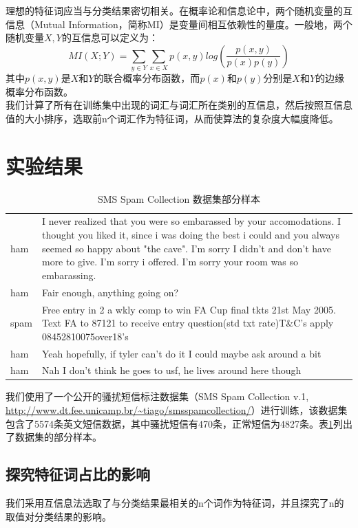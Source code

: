 \documentclass[a4paper, twocolumn, 12pt]{article}
\begin{document}
理想的特征词应当与分类结果密切相关。在概率论和信息论中，两个随机变量的互信息（Mutual Information，简称MI）是变量间相互依赖性的量度。一般地，两个随机变量$X, Y$的互信息可以定义为：
\[MI(X; Y)=\sum_{y\in Y}\sum_{x\in X}p(x, y)log(\frac{p(x, y)}{p(x)p(y)})\]
其中$p(x,y)$是$X$和$Y$的联合概率分布函数，而$p(x)$和$p(y)$分别是$X$和$Y$的边缘概率分布函数。\\

我们计算了所有在训练集中出现的词汇与词汇所在类别的互信息，然后按照互信息值的大小排序，选取前n个词汇作为特征词，从而使算法的复杂度大幅度降低。

\section{实验结果}

\begin{table}[hbtp]
    \centering
    \begin{tabular}{lp{14cm}}
        \hline
        ham&	I never realized that you were so embarassed by your accomodations. I thought you liked it, since i was doing the best i could and you always seemed so happy about "the cave". I'm sorry I didn't and don't have more to give. I'm sorry i offered. I'm sorry your room was so embarassing.\\
        ham&	Fair enough, anything going on?\\
        spam&	Free entry in 2 a wkly comp to win FA Cup final tkts 21st May 2005. Text FA to 87121 to receive entry question(std txt rate)T\&C's apply 08452810075over18's\\
        ham&	Yeah hopefully, if tyler can't do it I could maybe ask around a bit\\
        ham&	Nah I don't think he goes to usf, he lives around here though\\
        \hline
    \end{tabular}
    \caption{SMS Spam Collection 数据集部分样本}
    \label{table_1}
    \end{table}

我们使用了一个公开的骚扰短信标注数据集（SMS Spam Collection v.1, \url{http://www.dt.fee.unicamp.br/~tiago/smsspamcollection/}）进行训练，该数据集包含了5574条英文短信数据，其中骚扰短信有470条，正常短信为4827条。表\ref{table_1}列出了数据集的部分样本。\\

\subsection{探究特征词占比的影响}
我们采用互信息法选取了与分类结果最相关的n个词作为特征词，并且探究了n的取值对分类结果的影响。\\
\end{document}

